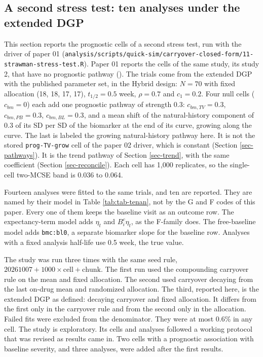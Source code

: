 \documentclass[
  11pt,
]{article}
\begin{document}
\subsection{A second stress test: ten analyses under the extended DGP}\label{sec-tenan}

This section reports the prognostic cells of a second stress test, run
with the driver of paper 01
(\texttt{analysis/scripts/quick-sim/carryover-closed-form/11-strawman-stress-test.R}).
Paper 01 reports the cells of the same study, its study 2, that have
no prognostic pathway (). The trials come from the
extended DGP with the published parameter set, in the Hybrid design:
\(N = 70\) with fixed allocation (18, 18, 17, 17), \(t_{1/2} = 0.5\) week,
\(\rho = 0.7\) and \(c_1 = 0.2\). Four null cells (\(c_{bm} = 0\)) each add
one prognostic pathway of strength 0.3: \(c_{bm,TV} = 0.3\),
\(c_{bm,PB} = 0.3\), \(c_{bm,BL} = 0.3\), and a mean shift of the
natural-history component of 0.3 of its SD per SD of the biomarker at
the end of its curve, growing along the curve. The last is labeled the
growing natural-history pathway here. It is not the stored
\texttt{prog-TV-grow} cell of the paper 02 driver, which is constant (Section
\ref{sec-pathways}). It is the trend pathway of Section
\ref{sec-trend}, with the same coefficient (Section
\ref{sec-reconcile}). Each cell has 1,000 replicates, so the
single-cell two-MCSE band is 0.036 to 0.064.

Fourteen analyses were fitted to the same trials, and ten are
reported. They are named by their model in Table
\ref{tab:tab-tenan}, not by the G and F codes of this paper. Every
one of them keeps the baseline visit as an outcome row. The
expectancy-term model adds \(\eta_t\) and \(B^c_i\eta_t\), as the F-family
does. The free-baseline model adds \texttt{bmc:bl0}, a separate biomarker
slope for the baseline row. Analyses with a fixed analysis half-life
use 0.5 week, the true value.

The study was run three times with the same seed rule,
\(20261007 + 1000 \times \text{cell} + \text{chunk}\). The first run
used the compounding carryover rule on the mean and fixed allocation.
The second used carryover decaying from the last on-drug mean and
randomized allocation. The third, reported here, is the extended DGP
as defined: decaying carryover and fixed allocation. It differs from
the first only in the carryover rule and from the second only in the
allocation. Failed fits were excluded from the denominator. They
were at most 0.6\% in any cell. The study is exploratory. Its cells and
analyses followed a working protocol that was revised as results came
in. Two cells with a prognostic association with baseline severity,
and three analyses, were added after the first results.
\end{document}
